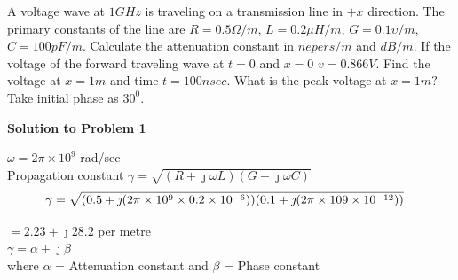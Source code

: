 \begin{exmp}
A voltage wave at ${1GH}z$ is traveling on a transmission line in ${+x}$ direction. The primary constants of the line are ${R=0.5\Omega/m}$, ${L=0.2\mu H/m}$, ${G=0.1\upsilon/m}$, ${C=100pF/m}$. Calculate the attenuation constant in ${nepers/m}$ and ${dB/m}$. If the voltage of the forward traveling wave at ${t=0}$ and ${x=0}$ ${v}=0.866V$. Find the voltage at ${x=1m}$ and time ${t=100nsec}$. What is the peak voltage at ${x=1m?}$ Take initial phase as ${30^0}$.


\begin{center}
\textbf{Solution to Problem 1}
\end{center}
$ \omega = 2\pi\times 10^{9} $ rad/sec\\
Propagation constant $\gamma = \sqrt{(R + \jmath\omega L)(G + \jmath\omega C)}$
\begin{dmath*}
\gamma=\\
 \sqrt{(0.5 + \jmath( 2\pi\times 10^{9} \times 0.2\times 10^{-6}))(0.1 + \jmath (2\pi\times 10{9} \times 10^{-12}))} \quad
\end{dmath*}

$ = 2.23 + \jmath 28.2$ per metre\\ 
$\gamma = \alpha + \jmath\beta$\\
where $\alpha$ = Attenuation constant and $\beta$ = Phase constant\\


\end{exmp}

